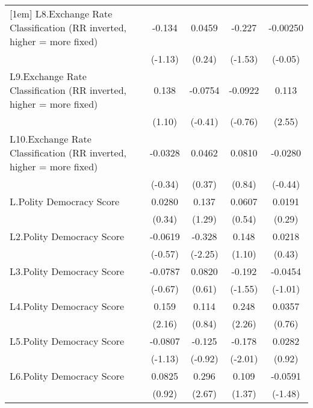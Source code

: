 {\begin{longtable}{l*{4}{c}}
[1em]
L8.Exchange Rate Classification (RR inverted, higher = more fixed)&   -0.134         &   0.0459         &   -0.227         & -0.00250         \\
                &  (-1.13)         &   (0.24)         &  (-1.53)         &  (-0.05)         \\
[1em]
L9.Exchange Rate Classification (RR inverted, higher = more fixed)&    0.138         &  -0.0754         &  -0.0922         &    0.113\sym{*}  \\
                &   (1.10)         &  (-0.41)         &  (-0.76)         &   (2.55)         \\
[1em]
L10.Exchange Rate Classification (RR inverted, higher = more fixed)&  -0.0328         &   0.0462         &   0.0810         &  -0.0280         \\
                &  (-0.34)         &   (0.37)         &   (0.84)         &  (-0.44)         \\
[1em]
L.Polity Democracy Score&   0.0280         &    0.137         &   0.0607         &   0.0191         \\
                &   (0.34)         &   (1.29)         &   (0.54)         &   (0.29)         \\
[1em]
L2.Polity Democracy Score&  -0.0619         &   -0.328\sym{*}  &    0.148         &   0.0218         \\
                &  (-0.57)         &  (-2.25)         &   (1.10)         &   (0.43)         \\
[1em]
L3.Polity Democracy Score&  -0.0787         &   0.0820         &   -0.192         &  -0.0454         \\
                &  (-0.67)         &   (0.61)         &  (-1.55)         &  (-1.01)         \\
[1em]
L4.Polity Democracy Score&    0.159\sym{*}  &    0.114         &    0.248\sym{*}  &   0.0357         \\
                &   (2.16)         &   (0.84)         &   (2.26)         &   (0.76)         \\
[1em]
L5.Polity Democracy Score&  -0.0807         &   -0.125         &   -0.178\sym{*}  &   0.0282         \\
                &  (-1.13)         &  (-0.92)         &  (-2.01)         &   (0.92)         \\
[1em]
L6.Polity Democracy Score&   0.0825         &    0.296\sym{**} &    0.109         &  -0.0591         \\
                &   (0.92)         &   (2.67)         &   (1.37)         &  (-1.48)         \\

\end{longtable}}
